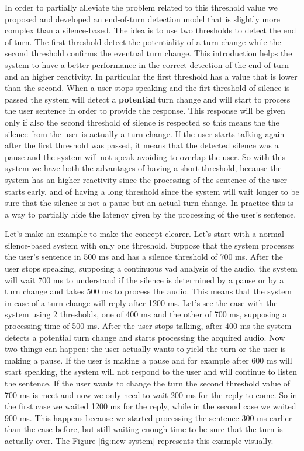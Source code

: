 \documentclass[../main.tex]{subfiles}
\begin{document}
In order to partially alleviate the problem related to this threshold value we proposed and developed an end-of-turn detection model that is slightly more complex than a silence-based. The idea is to use two thresholds to detect the end of turn. The first threshold detect the potentiality of a turn change while the second threshold confirms the eventual turn change. This introduction helps the system to have a better performance in the correct detection of the end of turn and an higher reactivity. In particular the first threshold has a value that is lower than the second. When a user stops speaking and the firt threshold of silence is passed the system will detect a \textbf{potential} turn change and will start to process the user sentence in order to provide the response. This response will be given only if also the second threshold of silence is respected so this means the the silence from the user is actually a turn-change. If the user starts talking again after the first threshold was passed, it means that the detected silence was a pause and the system will not speak avoiding to overlap the user. So with this system we have both the advantages of having a short threshold, because the system has an higher reactivity since the processing of the sentence of the user starts early, and of having a long threshold since the system will wait longer to be sure that the silence is not a pause but an actual turn change. In practice this is a way to partially hide the latency given by the processing of the user's sentence. 

Let's make an example to make the concept clearer. Let's start with a normal silence-based system with only one threshold. Suppose that the system processes the user's sentence in 500 ms and has a silence threshold of 700 ms. After the user stops speaking, supposing a continuous vad analysis of the audio, the system will wait 700 ms to understand if the silence is determined by a pause or by a turn change and takes 500 ms to process the audio. This means that the system in case of a turn change will reply after 1200 ms. Let's see the case with the system using 2 thresholds, one of 400 ms and the other of 700 ms, supposing a processing time of 500 ms. After the user stops talking, after 400 ms the system detects a potential turn change and starts processing the acquired audio. Now two things can happen: the user actually wants to yield the turn or the user is making a pause. If the user is making a pause and for example after 600 ms will start speaking, the system will not respond to the user and will continue to listen the sentence. If the user wants to change the turn the second threshold value of 700 ms is meet and now we only need to wait 200 ms for the reply to come. So in the first case we waited 1200 ms for the reply, while in the second case we waited 900 ms. This happens because we started processing the sentence 300 ms earlier than the case before, but still waiting enough time to be sure that the turn is actually over. The Figure \ref{fig:new system} represents this example visually.
\end{document}
